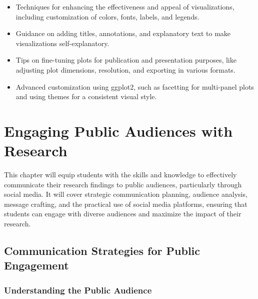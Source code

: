 \documentclass[
]{book}
\begin{document}
\begin{itemize}
\item
  Techniques for enhancing the effectiveness and appeal of visualizations, including customization of colors, fonts, labels, and legends.
\item
  Guidance on adding titles, annotations, and explanatory text to make visualizations self-explanatory.
\item
  Tips on fine-tuning plots for publication and presentation purposes, like adjusting plot dimensions, resolution, and exporting in various formats.
\item
  Advanced customization using ggplot2, such as facetting for multi-panel plots and using themes for a consistent visual style.
\end{itemize}

\hypertarget{engaging-public-audiences-with-research}{%
\chapter*{Engaging Public Audiences with Research}\label{engaging-public-audiences-with-research}}

This chapter will equip students with the skills and knowledge to effectively communicate their research findings to public audiences, particularly through social media. It will cover strategic communication planning, audience analysis, message crafting, and the practical use of social media platforms, ensuring that students can engage with diverse audiences and maximize the impact of their research.

\hypertarget{communication-strategies-for-public-engagement}{%
\section*{Communication Strategies for Public Engagement}\label{communication-strategies-for-public-engagement}}

\hypertarget{understanding-the-public-audience}{%
\subsection*{Understanding the Public Audience}\label{understanding-the-public-audience}}
\end{document}
